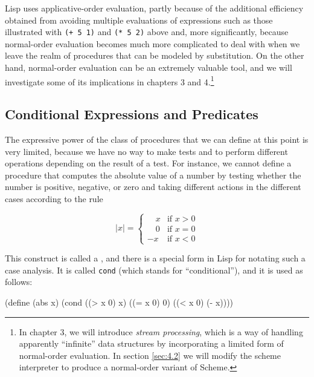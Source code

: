 \begin{schemedisplay}
Lisp uses applicative-order evaluation, partly because of the
additional efficiency obtained from avoiding multiple evaluations of
expressions such as those illustrated with \texttt{(+ 5 1)} and
\texttt{(* 5 2)} above and, more significantly, because normal-order
evaluation becomes much more complicated to deal with when we leave
the realm of procedures that can be modeled by substitution.  On the
other hand, normal-order evaluation can be an extremely valuable tool,
and we will investigate some of its implications in chapters 3 and
4.\footnote{In chapter 3, we will introduce \textit{stream
    processing}, which is a way of handling apparently ``infinite''
  data structures by incorporating a limited form of normal-order
  evaluation.  In section \ref{sec:4.2} we will modify the scheme
  interpreter to produce a normal-order variant of Scheme.}

\subsection{Conditional Expressions and Predicates}
\label{sec:1.1.6}

The expressive power of the class of procedures that we can define at
this point is very limited, because we have no way to make tests and
to perform different operations depending on the result of a test.
For instance, we cannot define a procedure that computes the absolute
value of a number by testing whether the number is positive, negative,
or zero and taking different actions in the different cases according
to the rule

\begin{equation*}
  |x| = 
    \begin{cases}
       \quad x & \text{if } x > 0 \\
       \quad 0 & \text{if } x = 0 \\
       -x & \text{if } x < 0
    \end{cases}
\end{equation*}

This construct is called a , and
there is a special form in Lisp for notating such a case
analysis.  It is called \texttt{cond} (which stands for
``conditional''), and it is used as follows:

\begin{schemedisplay}
(define (abs x)
  (cond ((> x 0) x)
        ((= x 0) 0)
        ((< x 0) (- x))))
\end{schemedisplay}


\end{schemedisplay}

